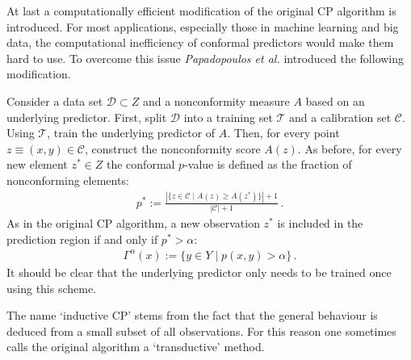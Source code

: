     At last a computationally efficient modification of the original CP algorithm is introduced. For most applications, especially those in machine learning and big data, the computational inefficiency of conformal predictors would make them hard to use. To overcome this issue \textit{Papadopoulos et al.} introduced the following modification.
    \begin{construct}[Inductive CP]
        Consider a data set $\mathcal{D}\subset Z$ and a nonconformity measure $A$ based on an underlying predictor. First, split $\mathcal{D}$ into a training set $\mathcal{T}$ and a calibration set $\mathcal{C}$. Using $\mathcal{T}$, train the underlying predictor of $A$. Then, for every point $z\equiv(x,y)\in\mathcal{C}$, construct the nonconformity score $A(z)$. As before, for every new element $z^*\in Z$ the conformal $p$-value is defined as the fraction of nonconforming elements:
        \begin{gather}
            \label{data:icp}
            p^* := \frac{|\{z\in\mathcal{C}\mid A(z)\geq A(z^*)\}|+1}{|\mathcal{C}|+1}\,.
       \end{gather}
        As in the original CP algorithm, a new observation $z^*$ is included in the prediction region if and only if $p^*>\alpha$:
        \begin{gather}
            \label{data:icp2}
            \Gamma^\alpha(x) := \{y\in Y\mid p(x,y)>\alpha\}\,.
        \end{gather}
        It should be clear that the underlying predictor only needs to be trained once using this scheme.
    \end{construct}
    \begin{remark}[Terminology]
        The name `inductive CP' stems from the fact that the general behaviour is deduced from a small subset of all observations. For this reason one sometimes calls the original algorithm a `transductive' method.
    \end{remark}

